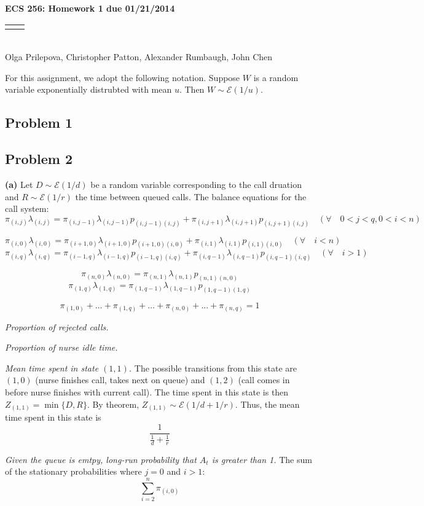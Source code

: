 \documentclass[12pt]{article}
\renewcommand{\title}[1]{\textbf{#1}\\}
\renewcommand{\line}{\begin{tabularx}{\textwidth}{X>{\raggedleft}X}\hline\\\end{tabularx}\\[-0.5cm]}
\begin{document}
\title{ECS 256: Homework 1 due 01/21/2014}
\line
Olga Prilepova, Christopher Patton, Alexander Rumbaugh, John Chen %


For this assignment, we adopt the following notation. Suppose $W$ is a random
variable exponentially distrubted with mean $u$. Then $W \sim \mathcal{E}(1/u)$.

\subsection*{Problem 1}



\subsection*{Problem 2}

\textbf{(a)} Let $D \sim \mathcal{E}(1/d)$ be a random variable corresponding 
to the call druation and $R \sim \mathcal{E}(1/r)$ the time between queued calls. 
The balance equations for the call system: 
$$ \pi_{(i,j)}\lambda_{(i,j)} = \pi_{(i,j-1)}\lambda_{(i,j-1)}p_{(i,j-1)(i,j)} + 
                                \pi_{(i,j+1)}\lambda_{(i,j+1)}p_{(i,j+1)(i,j)} 
  \quad (\forall \quad 0 < j < q, 0 < i < n)$$

$$ \pi_{(i,0)}\lambda_{(i,0)} = \pi_{(i+1,0)}\lambda_{(i+1,0)}p_{(i+1,0)(i,0)} + 
                                \pi_{(i,1)}\lambda_{(i,1)}p_{(i,1)(i,0)}
  \quad (\forall \quad i < n)$$
$$ \pi_{(i,q)}\lambda_{(i,q)} = \pi_{(i-1,q)}\lambda_{(i-1,q)}p_{(i-1,q)(i,q)} + 
                                \pi_{(i,q-1)}\lambda_{(i,q-1)}p_{(i,q-1)(i,q)}
  \quad (\forall \quad i > 1)$$

$$ \pi_{(n,0)}\lambda_{(n,0)} = \pi_{(n,1)}\lambda_{(n,1)}p_{(n,1)(n,0)} $$ 
$$ \pi_{(1,q)}\lambda_{(1,q)} = \pi_{(1,q-1)}\lambda_{(1,q-1)}p_{(1,q-1)(1,q)} $$

$$ \pi_{(1,0)} + \dots + \pi_{(1,q)} + \dots + \pi_{(n,0)} + ... + \pi_{(n,q)} = 1 $$

\textit{Proportion of rejected calls.}

\textit{Proportion of nurse idle time.}

\textit{Mean time spent in state $(1,1)$.} The possible transitions from this state are 
$(1,0)$ (nurse finishes call, takes next on queue) and $(1,2)$ (call comes in 
before nurse finishes with current call). The time spent in this state is then 
$Z_{(1,1)} = \min \{ D, R \}$. By theorem, $Z_{(1,1)} \sim \mathcal{E}(1/d + 1/r)$. Thus,
the mean time spent in this state is $$ \frac{1}{\frac{1}{d} + \frac{1}{r}} $$ 

\textit{Given the queue is emtpy, long-run probability that $A_t$ is greater than 1.} 
The sum of the stationary probabilities where $j=0$ and $i>1$: 
$$ \sum_{i=2}^n{\pi_{(i,0)}} $$
\end{document}
